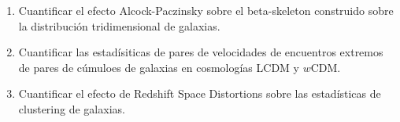 \begin{enumerate}
\item Cuantificar el efecto Alcock-Paczinsky sobre el beta-skeleton
  construido sobre la distribuci\'on tridimensional de galaxias. 

\item Cuantificar las estad\'isiticas de pares de velocidades de
  encuentros extremos de pares de c\'umuloes de galaxias en
  cosmolog\'ias LCDM y $w$CDM.

\item Cuantificar el efecto de Redshift Space Distortions sobre las
  estad\'isticas de clustering de galaxias.  
\end{enumerate}


